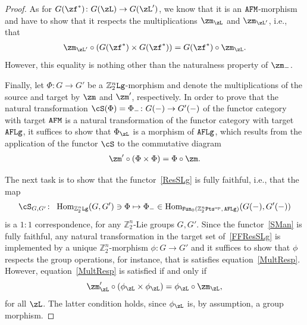 \documentclass[pdftex]{sigma}%
\newcommand{\op}[1]{\operatorname{#1}}
\newcommand{\Z}{{\mathbb Z}}
\newcommand{\0}{\otimes}
\newcommand{\z}{\Z_2^n}
\numberwithin{equation}{section}
\begin{document}
\begin{proof}
As for $G(\zf^*)\colon G(\zL)\to G(\zL')$, we know that it is an ${\tt AFM}$-morphism and have to show that it respects the multiplications $\zm_\zL$ and $\zm_{\zL'}$, i.e., that
\begin{gather}\label{MultRespNat}
\zm_{\zL'}\circ(G(\zf^*)\times G(\zf^*))=G(\zf^*)\circ\zm_\zL.
\end{gather}
However, this equality is nothing other than the naturalness property of $\zm_-$.

Finally, let $\Phi\colon G\to G'$ be a $\z{\tt Lg}$-morphism and denote the multiplications of the source and target by $\zm$ and $\zm'$, respectively. In order to prove that the natural transformation $\cS(\Phi)=\Phi_-\colon G(-)\to G'(-)$ of the functor category with target ${\tt AFM}$ is a natural transformation of the functor category with target ${\tt AFLg}$, it suffices to show that $\Phi_\zL$ is a morphism of ${\tt AFLg}$, which results from the application of the functor $\cS$ to the commutative diagram
\begin{gather}\label{MultResp}
\zm'\circ(\Phi\times\Phi)=\Phi\circ\zm.
\end{gather}

The next task is to show that the functor~\eqref{ResSLg} is fully faithful, i.e., that the map \begin{gather}\label{FFResSLg}
\cS_{G,G'}\colon\ \op{Hom}_{\z{\tt Lg}}(G,G')\ni\Phi\mapsto \Phi_-\in\op{Hom}_{{\tt Fun}_0(\z{\tt Pts}^{\op{op}},\,{\tt AFLg})}(G(-),G'(-))
\end{gather}
is a $1:1$ correspondence, for any $\z$-Lie groups $G,G'$. Since the functor~\eqref{SMan} is fully faithful, any natural transformation in the target set of~\eqref{FFResSLg} is implemented by a unique $\z$-morphism $\phi\colon G\to G'$ and it suffices to show that $\phi$ respects the group operations, for instance, that is satisfies equation~\eqref{MultResp}. However, equation~\eqref{MultResp} is satisfied if and only if
\[
\zm'_\zL\circ(\phi_\zL\times\phi_\zL)=\phi_\zL\circ \zm_\zL,
\]
for all $\zL$. The latter condition holds, since $\phi_\zL$ is, by assumption, a group morphism.


\end{proof}
\end{document}
